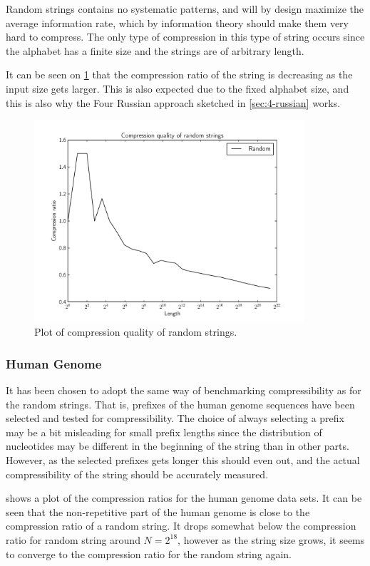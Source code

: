 \documentclass[twoside,11pt,openright]{report}
\begin{document}
Random strings contains no systematic patterns, and will by design maximize the average information rate, which by information theory should make them very hard to compress. The only type of compression in this type of string occurs since the alphabet has a finite size and the strings are of arbitrary length.

It can be seen on \cref{fig:compression:quality:random} that the compression ratio of the string is decreasing as the input size gets larger. This is also expected due to the fixed alphabet size, and this is also why the Four Russian approach sketched in \cref{sec:4-russian} works.
%
\begin{figure}[h!]
  \centering
  \includegraphics[width=10cm]{compression/random}
  \caption{Plot of compression quality of random strings.}
  \label{fig:compression:quality:random}
\end{figure}

\subsubsection{Human Genome}
It has been chosen to adopt the same way of benchmarking compressibility as for the random strings. That is, prefixes of the human genome sequences have been selected and tested for compressibility. The choice of always selecting a prefix may be a bit misleading for small prefix lengths since the distribution of nucleotides may be different in the beginning of the string than in other parts. However, as the selected prefixes gets longer this should even out, and the actual compressibility of the string should be accurately measured.

 shows a plot of the compression ratios for the human genome data sets. It can be seen that the non-repetitive part of the human genome is close to the compression ratio of a random string. It drops somewhat below the compression ratio for random string around $N = 2^{18}$, however as the string size grows, it seems to converge to the compression ratio for the random string again.
\end{document}
